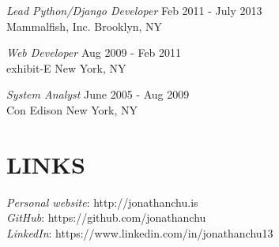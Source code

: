 \documentclass[line,margin]{res}
\begin{document}
\begin{resume}
                {\sl Lead Python/Django Developer} \hfill     Feb 2011 - July 2013 \\
                Mammalfish, Inc.
                Brooklyn, NY

                {\sl Web Developer} \hfill                    Aug 2009 - Feb 2011 \\
                exhibit-E
                New York, NY

                {\sl System Analyst} \hfill                   June 2005 - Aug 2009 \\
                Con Edison
                New York, NY


\section{LINKS} {\sl Personal website}: http://jonathanchu.is \\
                {\sl GitHub}: https://github.com/jonathanchu \\
                {\sl LinkedIn}: https://www.linkedin.com/in/jonathanchu13


\end{resume}
\end{document}
